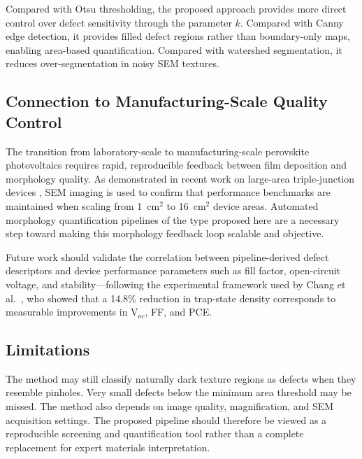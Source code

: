 \documentclass[pdflatex,sn-mathphys-num,iicol]{sn-jnl}
\theoremstyle{thmstyleone}
\theoremstyle{thmstyletwo}
\theoremstyle{thmstylethree}
\begin{document}
Compared with Otsu thresholding, the proposed approach provides more
direct control over defect sensitivity through the parameter $k$.
Compared with Canny edge detection, it provides filled defect regions
rather than boundary-only maps, enabling area-based quantification.
Compared with watershed segmentation, it reduces over-segmentation
in noisy SEM textures.

\subsection{Connection to Manufacturing-Scale Quality Control}

The transition from laboratory-scale to manufacturing-scale perovskite
photovoltaics requires rapid, reproducible feedback between film
deposition and morphology quality. As demonstrated in recent work on
large-area triple-junction devices \cite{zheng2025}, SEM imaging is
used to confirm that performance benchmarks are maintained when
scaling from 1~cm$^2$ to 16~cm$^2$ device areas. Automated morphology
quantification pipelines of the type proposed here are a necessary
step toward making this morphology feedback loop scalable and
objective.

Future work should validate the correlation between pipeline-derived
defect descriptors and device performance parameters such as fill
factor, open-circuit voltage, and stability---following the
experimental framework used by Chang et al.\ \cite{chang2026}, who
showed that a 14.8\% reduction in trap-state density corresponds to
measurable improvements in V$_{oc}$, FF, and PCE.

\subsection{Limitations}

The method may still classify naturally dark texture regions as
defects when they resemble pinholes. Very small defects below the
minimum area threshold may be missed. The method also depends on
image quality, magnification, and SEM acquisition settings. The
proposed pipeline should therefore be viewed as a reproducible
screening and quantification tool rather than a complete replacement
for expert materials interpretation.

\end{document}
